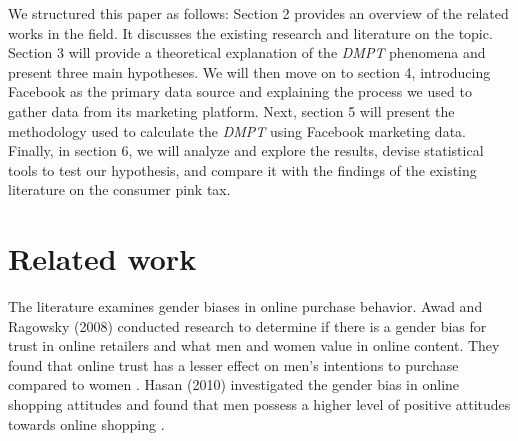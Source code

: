 \documentclass[twocolumn]{bmcart}\usepackage{lineno}
\begin{document}






We structured this paper as follows: \color{blue} Section 2 provides an overview of the related works in the field. It discusses the existing research and literature on the topic.\color{black} Section 3 will provide a theoretical explanation of the \emph{DMPT} phenomena and present three main hypotheses. We will then move on to section 4, introducing Facebook as the primary data source and explaining the process we used to gather data from its marketing platform. Next, section 5 will present the methodology used to calculate the \emph{DMPT} using Facebook marketing data. Finally, in section 6, we will analyze and explore the results, devise statistical tools to test our hypothesis, and compare it with the findings of the existing literature on the consumer pink tax.

\color{blue}
\section{Related work}
The literature examines gender biases in online purchase behavior. Awad and Ragowsky (2008) conducted research to determine if there is a gender bias for trust in online retailers and what men and women value in online content. They found that online trust has a lesser effect on men's intentions to purchase compared to women \cite{awad2008establishing}. Hasan (2010) investigated the gender bias in online shopping attitudes and found that men possess a higher level of positive attitudes towards online shopping \cite{hasan2010exploring}.
\end{document}
